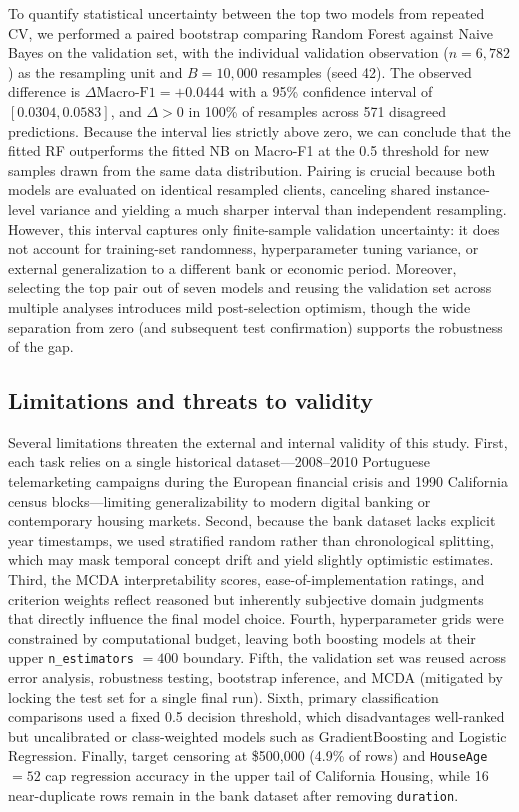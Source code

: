 To quantify statistical uncertainty between the top two models from repeated CV, we performed a paired bootstrap comparing Random Forest against Naive Bayes on the validation set, with the individual validation observation ($n = 6{,}782$) as the resampling unit and $B = 10{,}000$ resamples (seed 42). The observed difference is $\Delta\text{Macro-F1} = +0.0444$ with a 95\% confidence interval of $[0.0304, 0.0583]$, and $\Delta > 0$ in 100\% of resamples across 571 disagreed predictions. Because the interval lies strictly above zero, we can conclude that the fitted RF outperforms the fitted NB on Macro-F1 at the 0.5 threshold for new samples drawn from the same data distribution. Pairing is crucial because both models are evaluated on identical resampled clients, canceling shared instance-level variance and yielding a much sharper interval than independent resampling. However, this interval captures only finite-sample validation uncertainty: it does not account for training-set randomness, hyperparameter tuning variance, or external generalization to a different bank or economic period. Moreover, selecting the top pair out of seven models and reusing the validation set across multiple analyses introduces mild post-selection optimism, though the wide separation from zero (and subsequent test confirmation) supports the robustness of the gap.

\subsection{Limitations and threats to validity}
Several limitations threaten the external and internal validity of this study. First, each task relies on a single historical dataset---2008--2010 Portuguese telemarketing campaigns during the European financial crisis and 1990 California census blocks---limiting generalizability to modern digital banking or contemporary housing markets. Second, because the bank dataset lacks explicit year timestamps, we used stratified random rather than chronological splitting, which may mask temporal concept drift and yield slightly optimistic estimates. Third, the MCDA interpretability scores, ease-of-implementation ratings, and criterion weights reflect reasoned but inherently subjective domain judgments that directly influence the final model choice. Fourth, hyperparameter grids were constrained by computational budget, leaving both boosting models at their upper \texttt{n\_estimators} $= 400$ boundary. Fifth, the validation set was reused across error analysis, robustness testing, bootstrap inference, and MCDA (mitigated by locking the test set for a single final run). Sixth, primary classification comparisons used a fixed 0.5 decision threshold, which disadvantages well-ranked but uncalibrated or class-weighted models such as GradientBoosting and Logistic Regression. Finally, target censoring at \$500,000 (4.9\% of rows) and \texttt{HouseAge} $= 52$ cap regression accuracy in the upper tail of California Housing, while 16 near-duplicate rows remain in the bank dataset after removing \texttt{duration}.
